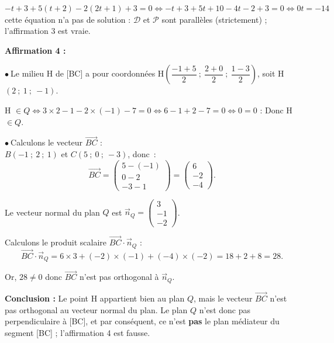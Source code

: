 \documentclass[10pt]{article}
\begin{document}
$- t + 3 + 5(t + 2) - 2(2t + 1)  + 3 = 0 \iff -t + 3 + 5t + 10 - 4t - 2 + 3 = 0 \iff 0t = - 14$  cette équation n'a pas de solution : $\mathcal{D}$ et $\mathcal{P}$ sont parallèles (strictement) ; l'affirmation 3 est vraie.
\medskip

\textbf{Affirmation 4 :}






$\bullet~$Le milieu H de [BC] a pour coordonnées H$\left(\dfrac{-1 + 5}{2}~;~\dfrac{2 + 0}{2}~;~\dfrac{1 - 3}{2}\right)$, soit H$(2~;~1~;~-1)$.

H $\in Q \iff 3 \times 2 - 1 - 2 \times (-1) - 7 = 0 \iff 6 - 1 + 2 - 7 = 0 \iff 0 = 0$ : Donc H $\in Q$.

\vspace{0.5em}

$\bullet~$Calculons le vecteur $\vec{BC}$ :\\
$B(-1~;~2~;~1)$ et $C(5~;~0~;~-3)$, donc~:
\[
\vec{BC} = \begin{pmatrix} 5 - (-1) \\ 0 - 2 \\ -3 - 1 \end{pmatrix} = \begin{pmatrix} 6 \\ -2 \\ -4 \end{pmatrix}.
\]

Le vecteur normal du plan $Q$ est $\vec{n}_Q = \begin{pmatrix} 3 \\ -1 \\ -2 \end{pmatrix}$.

Calculons le produit scalaire $\vec{BC} \cdot \vec{n}_Q$ :
\[
\vec{BC} \cdot \vec{n}_Q = 6 \times 3 + (-2) \times (-1) + (-4) \times (-2) = 18 + 2 + 8 = 28.
\]

Or, $28 \neq 0$ donc $\vec{BC}$ n'est pas orthogonal à $\vec{n}_Q$.

\vspace{0.5em}

\textbf{Conclusion :} Le point H appartient bien au plan $Q$, mais le vecteur $\vec{BC}$ n'est pas orthogonal au vecteur normal du plan. Le plan $Q$ n'est donc pas perpendiculaire à [BC], et par conséquent, ce n'est \textbf{pas} le plan médiateur du segment [BC] ; l'affirmation 4 est fausse.


\medskip
\end{document}
